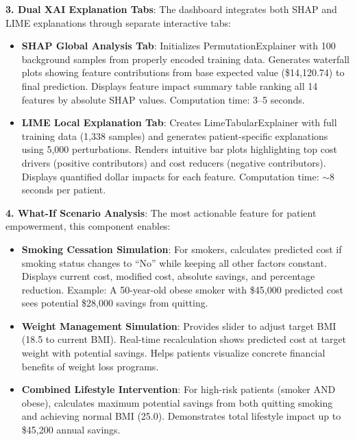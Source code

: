 \documentclass[conference]{IEEEtran}
\begin{document}
\textbf{3. Dual XAI Explanation Tabs}: The dashboard integrates both SHAP and LIME explanations through separate interactive tabs:

\begin{itemize}
\item \textbf{SHAP Global Analysis Tab}: Initializes PermutationExplainer with 100 background samples from properly encoded training data. Generates waterfall plots showing feature contributions from base expected value (\$14,120.74) to final prediction. Displays feature impact summary table ranking all 14 features by absolute SHAP values. Computation time: 3--5 seconds.

\item \textbf{LIME Local Explanation Tab}: Creates LimeTabularExplainer with full training data (1,338 samples) and generates patient-specific explanations using 5,000 perturbations. Renders intuitive bar plots highlighting top cost drivers (positive contributors) and cost reducers (negative contributors). Displays quantified dollar impacts for each feature. Computation time: $\sim$8 seconds per patient.
\end{itemize}

\textbf{4. What-If Scenario Analysis}: The most actionable feature for patient empowerment, this component enables:

\begin{itemize}
\item \textbf{Smoking Cessation Simulation}: For smokers, calculates predicted cost if smoking status changes to ``No'' while keeping all other factors constant. Displays current cost, modified cost, absolute savings, and percentage reduction. Example: A 50-year-old obese smoker with \$45,000 predicted cost sees potential \$28,000 savings from quitting.

\item \textbf{Weight Management Simulation}: Provides slider to adjust target BMI (18.5 to current BMI). Real-time recalculation shows predicted cost at target weight with potential savings. Helps patients visualize concrete financial benefits of weight loss programs.

\item \textbf{Combined Lifestyle Intervention}: For high-risk patients (smoker AND obese), calculates maximum potential savings from both quitting smoking and achieving normal BMI (25.0). Demonstrates total lifestyle impact up to \$45,200 annual savings.
\end{itemize}
\end{document}

